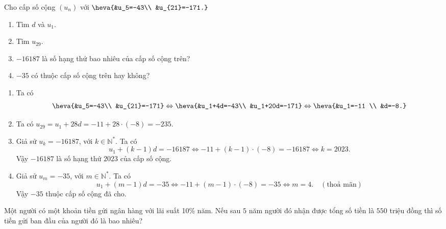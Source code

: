 \begin{bt}%
	Cho cấp số cộng $(u_n)$ với $\heva{&u_5=-43\\ &u_{21}=-171.}$
	\begin{enumerate}
		\item Tìm $d$ và $u_1$.
		\item Tìm $u_{29}$.
		\item $-16187$ là số hạng thứ bao nhiêu của cấp số cộng trên?
		\item $-35$ có thuộc cấp số cộng trên hay không?		
	\end{enumerate}
	\loigiai
	{
		\begin{enumerate}
			\item Ta có
			\begin{eqnarray*}
				\heva{&u_5=-43\\ &u_{21}=-171} \Leftrightarrow \heva{&u_1+4d=-43\\ &u_1+20d=-171} \Leftrightarrow \heva{&u_1=-11 \\ &d=-8.}
			\end{eqnarray*}
			\item Ta có $u_{29}= u_1+28d= -11+28 \cdot (-8)= -235$.
			\item Giả sử $u_k= -16187$, với $k \in \mathbb{N}^*$. Ta có
			\[
			u_1+ (k-1)d= -16187 \Leftrightarrow -11 + (k-1) \cdot (-8)= -16187 \Leftrightarrow k= 2023.
			\]
			Vậy $-16187$ là số hạng thứ $2023$ của cấp số cộng.
			\item Giả sử $u_m= -35$, với $m\in \mathbb{N}^*$. Ta có
			\[
			u_1+ (m-1) d= -35 \Leftrightarrow -11+ (m-1) \cdot (-8)= -35 \Leftrightarrow m=4. \quad (\text{thoả mãn})
			\]
			Vậy $-35$ thuộc cấp số cộng đã cho.
		\end{enumerate}
	}
\end{bt}

\begin{bt}%
	Một người có một khoản tiền gửi ngân hàng với lãi suất 10\% năm. Nếu sau $ 5 $ năm người đó nhận được tổng số tiền là $ 550 $ triệu đồng thì số tiền gửi ban đầu của người đó là bao nhiêu?
\end{bt}

